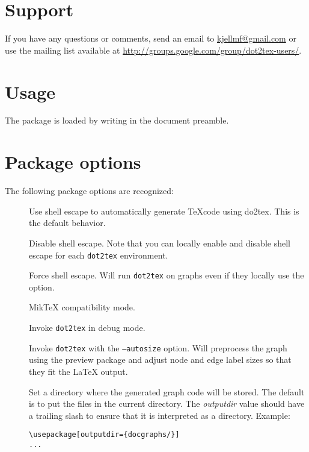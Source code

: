 \documentclass[a4paper]{ltxdoc}
\begin{document}
\section{Support}

If you have any questions or comments, send an email to \url{kjellmf@gmail.com} or use the mailing list available at \url{http://groups.google.com/group/dot2tex-users/}.

\section{Usage}

The package is loaded by writing  in the document preamble.

\section{Package options}

The following package options are recognized:

\begin{description}
\item[] Use shell escape to automatically generate \TeX code using do2tex. This is the default behavior.
\item[] Disable shell escape. Note that you can locally  enable and disable shell escape for each \texttt{dot2tex} environment.
\item[] Force shell escape. Will run \texttt{dot2tex} on graphs even if they locally use the  option.
\item[] MikTeX compatibility mode.
\item[] Invoke \texttt{dot2tex} in debug mode.
\item[] Invoke \texttt{dot2tex} with the \texttt{--autosize} option. Will preprocess the graph using the preview package and adjust node and edge label sizes so that they fit the LaTeX output.
\item[] Set a directory where the generated graph code will be stored. The default is to put the files in the current directory. The \emph{outputdir} value should have a trailing slash to ensure that it is interpreted as a directory. Example:
\begin{verbatim}
\usepackage[outputdir={docgraphs/}]
...
\end{verbatim}
\end{description}
\end{document}
